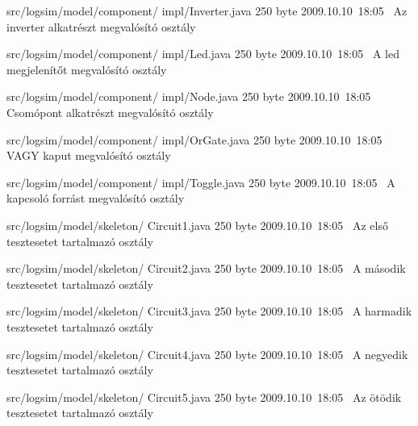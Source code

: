 \begin{fajllista}
\fajl
{src/logsim/model/component/\newline
impl/Inverter.java} %
{250 byte} %
{2009.10.10~18:05~} %
{Az inverter alkatrészt megvalósító osztály} %

\fajl
{src/logsim/model/component/\newline
impl/Led.java} %
{250 byte} %
{2009.10.10~18:05~} %
{A led megjelenítőt megvalósító osztály} %

\fajl
{src/logsim/model/component/\newline
impl/Node.java} %
{250 byte} %
{2009.10.10~18:05~} %
{Csomópont alkatrészt megvalósító osztály} %

\fajl
{src/logsim/model/component/\newline
impl/OrGate.java} %
{250 byte} %
{2009.10.10~18:05~} %
{VAGY kaput megvalósító osztály} %

\fajl
{src/logsim/model/component/\newline
impl/Toggle.java} %
{250 byte} %
{2009.10.10~18:05~} %
{A kapcsoló forrást megvalósító osztály} %

\fajl
{src/logsim/model/skeleton/\newline
Circuit1.java} %
{250 byte} %
{2009.10.10~18:05~} %
{Az első tesztesetet tartalmazó osztály} %

\fajl
{src/logsim/model/skeleton/\newline
Circuit2.java} %
{250 byte} %
{2009.10.10~18:05~} %
{A második tesztesetet tartalmazó osztály} %

\fajl
{src/logsim/model/skeleton/\newline
Circuit3.java} %
{250 byte} %
{2009.10.10~18:05~} %
{A harmadik tesztesetet tartalmazó osztály} %

\fajl
{src/logsim/model/skeleton/\newline
Circuit4.java} %
{250 byte} %
{2009.10.10~18:05~} %
{A negyedik tesztesetet tartalmazó osztály} %

\fajl
{src/logsim/model/skeleton/\newline
Circuit5.java} %
{250 byte} %
{2009.10.10~18:05~} %
{Az ötödik tesztesetet tartalmazó osztály} %

\end{fajllista}

